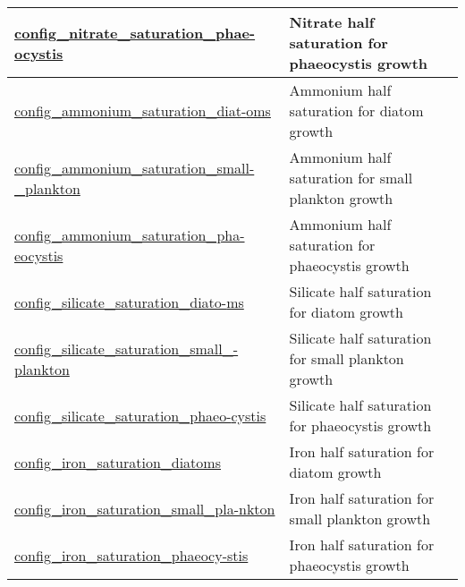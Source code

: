 {\begin{center}
\begin{longtable}{| p{2.0in} || p{4.0in} |}
    \hline
    \hyperref[subsec:nm_sec_config_nitrate_saturation_phaeocystis]{config\_nitrate\_saturation\_phae-}\hyperref[subsec:nm_sec_config_nitrate_saturation_phaeocystis]{ocystis}& Nitrate half saturation for phaeocystis growth \\
    \hline
    \hyperref[subsec:nm_sec_config_ammonium_saturation_diatoms]{config\_ammonium\_saturation\_diat-}\hyperref[subsec:nm_sec_config_ammonium_saturation_diatoms]{oms}& Ammonium half saturation for diatom growth \\
    \hline
    \hyperref[subsec:nm_sec_config_ammonium_saturation_small_plankton]{config\_ammonium\_saturation\_small-}\hyperref[subsec:nm_sec_config_ammonium_saturation_small_plankton]{\_plankton}& Ammonium half saturation for small plankton growth \\
    \hline
    \hyperref[subsec:nm_sec_config_ammonium_saturation_phaeocystis]{config\_ammonium\_saturation\_pha-}\hyperref[subsec:nm_sec_config_ammonium_saturation_phaeocystis]{eocystis}& Ammonium half saturation for phaeocystis growth \\
    \hline
    \hyperref[subsec:nm_sec_config_silicate_saturation_diatoms]{config\_silicate\_saturation\_diato-}\hyperref[subsec:nm_sec_config_silicate_saturation_diatoms]{ms}& Silicate half saturation for diatom growth \\
    \hline
    \hyperref[subsec:nm_sec_config_silicate_saturation_small_plankton]{config\_silicate\_saturation\_small\_-}\hyperref[subsec:nm_sec_config_silicate_saturation_small_plankton]{plankton}& Silicate half saturation for small plankton growth \\
    \hline
    \hyperref[subsec:nm_sec_config_silicate_saturation_phaeocystis]{config\_silicate\_saturation\_phaeo-}\hyperref[subsec:nm_sec_config_silicate_saturation_phaeocystis]{cystis}& Silicate half saturation for phaeocystis growth \\
    \hline
    \hyperref[subsec:nm_sec_config_iron_saturation_diatoms]{config\_iron\_saturation\_diatoms} & Iron half saturation for diatom growth \\
    \hline
    \hyperref[subsec:nm_sec_config_iron_saturation_small_plankton]{config\_iron\_saturation\_small\_pla-}\hyperref[subsec:nm_sec_config_iron_saturation_small_plankton]{nkton}& Iron half saturation for small plankton growth \\
    \hline
    \hyperref[subsec:nm_sec_config_iron_saturation_phaeocystis]{config\_iron\_saturation\_phaeocy-}\hyperref[subsec:nm_sec_config_iron_saturation_phaeocystis]{stis}& Iron half saturation for phaeocystis growth \\

\end{longtable}
\end{center}}
